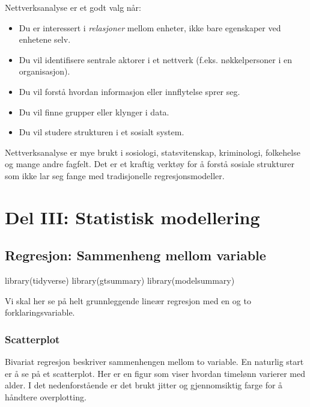 \documentclass[
  norsk,
  letterpaper,
  DIV=11,
  numbers=noendperiod]{scrreprt}
\newenvironment{Shaded}{\begin{snugshade}}{\end{snugshade}}
\newcommand{\FunctionTok}[1]{\textcolor[rgb]{0.28,0.35,0.67}{#1}}
\newcommand{\NormalTok}[1]{\textcolor[rgb]{0.00,0.23,0.31}{#1}}
\providecommand{\tightlist}{%
  \setlength{\itemsep}{0pt}\setlength{\parskip}{0pt}}
\theoremstyle{definition}
\theoremstyle{remark}
\begin{document}
Nettverksanalyse er et godt valg når:

\begin{itemize}
\tightlist
\item
  Du er interessert i \emph{relasjoner} mellom enheter, ikke bare
  egenskaper ved enhetene selv.
\item
  Du vil identifisere sentrale aktorer i et nettverk (f.eks.
  nøkkelpersoner i en organisasjon).
\item
  Du vil forstå hvordan informasjon eller innflytelse sprer seg.
\item
  Du vil finne grupper eller klynger i data.
\item
  Du vil studere strukturen i et sosialt system.
\end{itemize}

Nettverksanalyse er mye brukt i sosiologi, statsvitenskap, kriminologi,
folkehelse og mange andre fagfelt. Det er et kraftig verktøy for å
forstå sosiale strukturer som ikke lar seg fange med tradisjonelle
regresjonsmodeller.

\part{Del III: Statistisk modellering}

\chapter{Regresjon: Sammenheng mellom
variable}\label{regresjon-sammenheng-mellom-variable}

\begin{Shaded}
\begin{Highlighting}[]
\FunctionTok{library}\NormalTok{(tidyverse)}
\FunctionTok{library}\NormalTok{(gtsummary)}
\FunctionTok{library}\NormalTok{(modelsummary)}
\end{Highlighting}
\end{Shaded}

Vi skal her se på helt grunnleggende lineær regresjon med en og to
forklaringsvariable.

\section{Scatterplot}\label{scatterplot-1}

Bivariat regresjon beskriver sammenhengen mellom to variable. En
naturlig start er å se på et scatterplot. Her er en figur som viser
hvordan timelønn varierer med alder. I det nedenforstående er det brukt
jitter og gjennomsiktig farge for å håndtere overplotting.
\end{document}
